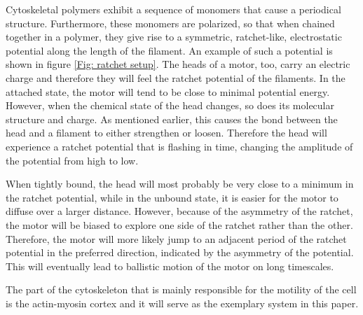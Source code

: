 \documentclass[aps,pre,twocolumn,showpacs,showkeys]{revtex4-1}
\begin{document}
Cytoskeletal polymers exhibit a sequence of monomers that cause a periodical structure. 
Furthermore, these monomers are polarized, so that when chained together in a polymer, they give rise to a symmetric, ratchet-like, electrostatic potential along the length of the filament. 
An example of such a potential is shown in figure \ref{Fig: ratchet setup}. 
The heads of a motor, too, carry an electric charge and therefore they will feel the ratchet potential of the filaments. 
In the attached state, the motor will tend to be close to minimal potential energy. 
However, when the chemical state of the head changes, so does its molecular structure and charge. 
As mentioned earlier, this causes the bond between the head and a filament to either strengthen or loosen. 
Therefore the head will experience a ratchet potential that is flashing in time, changing the amplitude of the potential from high to low.


When tightly bound, the head will most probably be very close to a minimum in the ratchet potential, while in the unbound state, it is easier for the motor to diffuse over a larger distance. 
However, because of the asymmetry of the ratchet, the motor will be biased to explore one side of the ratchet rather than the other. 
Therefore, the motor will more likely jump to an adjacent period of the ratchet potential in the preferred direction, indicated by the asymmetry of the potential. 
This will eventually lead to ballistic motion of the motor on long timescales.


The part of the cytoskeleton that is mainly responsible for the motility of the cell is the actin-myosin cortex and it will serve as the exemplary system in this paper.
\end{document}
